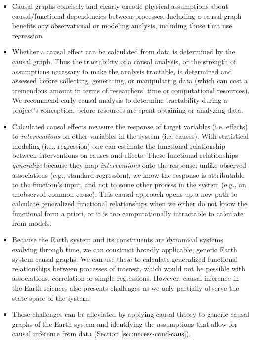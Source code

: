 \documentclass[12pt]{article}
\begin{document}
\begin{itemize}
\item Causal graphs concisely and clearly encode physical assumptions about
  causal/functional dependencies between processes. Including a causal
  graph benefits any observational or modeling analysis, including
  those that use regression.
\item Whether a causal effect can be calculated from data is
  determined by the causal graph. Thus the tractability of a causal
  analysis, or the strength of assumptions necessary to make the
  analysis tractable, is determined and assessed before collecting,
  generating, or manipulating data (which can cost a tremendous amount
  in terms of researchers' time or computational resources). We
  recommend early causal analysis to determine tractability during a
  project's conception, before resources are spent obtaining or
  analyzing data.
\item Calculated causal effects measure the response of target
  variables (i.e. effects) to \textit{interventions} on other
  variables in the system (i.e. causes). With statistical modeling
  (i.e., regression) one can estimate the functional relationship
  between interventions on causes and effects.  These functional
  relationships \textit{generalize} because they map
  \textit{interventions} onto the response: unlike observed
  associations (e.g., standard regression), we know the response is
  attributable to the function's input, and not to some other process in
  the system (e.g., an unobserved common cause). This causal approach opens
  up a new path to calculate generalized functional relationships when
  we either do not know the functional form a priori, or it is too
  computationally intractable to calculate from models.
\item Because the Earth system and its constituents are dynamical
  systems evolving through time, we can construct broadly applicable,
  generic Earth system causal graphs. We can use these to calculate
  generalized functional relationships between processes of interest,
  which would not be possible with associations, correlation or simple
  regressions. However, causal inference in the Earth sciences also presents
  challenges as we only partially observe the state space of the
  system.
\item These challenges can be alleviated by applying causal theory to
  generic causal graphs of the Earth system and identifying the
  assumptions that allow for causal inference from data (Section
  \ref{sec:necess-cond-caus}).
\end{itemize}
\end{document}
